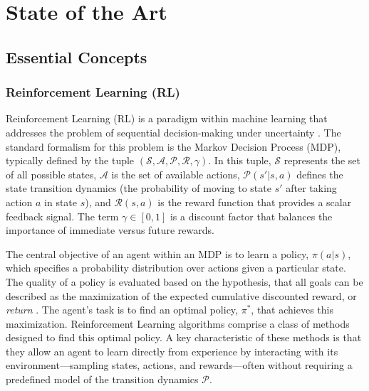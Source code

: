 \documentclass[12pt, a4paper]{report}
\begin{document}
\chapter{State of the Art}

\section{Essential Concepts}

\subsection{Reinforcement Learning (RL)}
Reinforcement Learning (RL) is a paradigm within machine learning that addresses the problem of sequential decision-making under uncertainty \cite{Arulkumaran_Deisenroth_Brundage_Bharath_2017}. The standard formalism for this problem is the Markov Decision Process (MDP), typically defined by the tuple $(\mathcal{S}, \mathcal{A}, \mathcal{P}, \mathcal{R}, \gamma)$. In this tuple, $\mathcal{S}$ represents the set of all possible states, $\mathcal{A}$ is the set of available actions, $\mathcal{P}(s'|s, a)$ defines the state transition dynamics (the probability of moving to state $s'$ after taking action $a$ in state $s$), and $\mathcal{R}(s, a)$ is the reward function that provides a scalar feedback signal. The term $\gamma \in [0, 1]$ is a discount factor that balances the importance of immediate versus future rewards.

The central objective of an agent within an MDP is to learn a policy, $\pi(a|s)$, which specifies a probability distribution over actions given a particular state. The quality of a policy is evaluated based on the hypothesis, that all goals can be described as the maximization of the expected cumulative discounted reward, or \textit{return} \cite{Arulkumaran_Deisenroth_Brundage_Bharath_2017}. The agent's task is to find an optimal policy, $\pi^*$, that achieves this maximization. Reinforcement Learning algorithms comprise a class of methods designed to find this optimal policy. A key characteristic of these methods is that they allow an agent to learn directly from experience by interacting with its environment---sampling states, actions, and rewards---often without requiring a predefined model of the transition dynamics $\mathcal{P}$.
\end{document}
